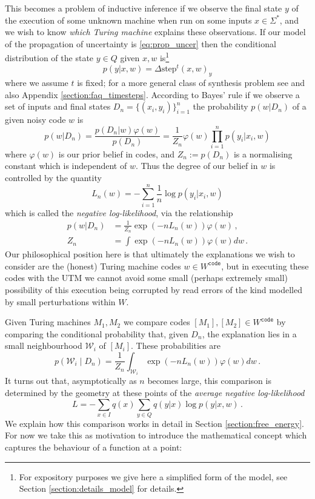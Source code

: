 \documentclass[english,letter paper,12pt,reqno]{article}
\theoremstyle{definition}
\begin{document}
This becomes a problem of inductive inference \cite[\S 7]{clift2018derivatives} if we observe the final state $y$ of the execution of some unknown machine when run on some inputs $x \in \Sigma^*$, and we wish to know \emph{which Turing machine} explains these observations. If our model of the propagation of uncertainty is \eqref{eq:prop_uncer} then the conditional distribution of the state $y \in Q$ given $x,w$ is\footnote{For expository purposes we give here a simplified form of the model, see Section \ref{section:details_model} for details.}
\begin{equation}
\label{eq:posterior}
p(y|x,w) = \Delta \textrm{step}^t(x,w)_y
\end{equation}
where we assume $t$ is fixed; for a more general class of synthesis problem see \cite{waring2021geometric} and also Appendix \ref{section:faq_timesteps}. According to Bayes' rule if we observe a set of inputs and final states $D_n = \{ (x_i, y_i) \}_{i=1}^n$ the probability $p(w|D_n)$ of a given noisy code $w$ is
\begin{equation}
p(w|D_n) = \frac{p(D_n|w) \varphi(w)}{p(D_n)} = \frac{1}{Z_n} \varphi(w) \prod_{i=1}^n p(y_i | x_i, w)
\end{equation}
where $\varphi(w)$ is our prior belief in codes, and $Z_n := p(D_n)$ is a normalising constant which is independent of $w$. Thus the degree of our belief in $w$ is controlled by the quantity
\begin{equation}
L_n(w) = - \sum_{i=1}^n \frac{1}{n} \log p(y_i|x_i,w)
\end{equation}
which is called the \emph{negative log-likelihood}, via the relationship
\begin{align}
p(w|D_n) &= \frac{1}{Z_n} \exp(-n L_n(w)) \varphi(w)\,, \label{eq:posterior_defn}\\
Z_n &= \int \exp(-n L_n(w) ) \varphi(w) dw\,. \label{eq:zn_defn}
\end{align}
Our philosophical position here is that ultimately the explanations we wish to consider are the (honest) Turing machine codes $w \in W^{\texttt{code}}$, but in executing these codes with the UTM we cannot avoid some small (perhaps extremely small) possibility of this execution being corrupted by read errors of the kind modelled by small perturbations within $W$.

Given Turing machines $M_1, M_2$ we compare codes $[M_1], [M_2] \in W^{\texttt{code}}$ by comparing the conditional probability that, given $D_n$, the explanation lies in a small neighbourhood $\mathcal{W}_i$ of $[M_i]$. These probabilities are
\begin{equation}\label{eq:pmathcalw}
p(\mathcal{W}_i \mid D_n) = \frac{1}{Z_n} \int_{\mathcal{W}_i} \exp(-n L_n(w) ) \varphi(w) dw\,.
\end{equation}
It turns out that, asymptotically as $n$ becomes large, this comparison is determined by the geometry at these points of the \emph{average negative log-likelihood}
\[
L = - \sum_{x \in I} q(x) \sum_{y \in Q} q(y|x) \log p(y|x,w)\,.
\]
We explain how this comparison works in detail in Section \ref{section:free_energy}. For now we take this as motivation to introduce the mathematical concept which captures the behaviour of a function at a point:
\end{document}
